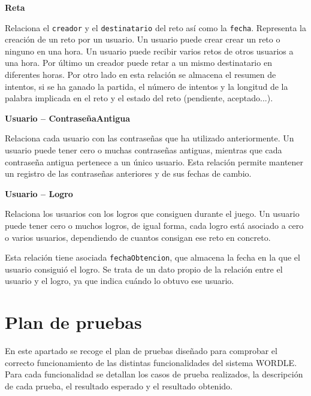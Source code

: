\documentclass[a4paper,11pt]{article}
\begin{document}
\par\vspace{0.5cm}
\noindent\textbf{Reta}

Relaciona el \texttt{creador} y el \texttt{destinatario} del reto así como la \texttt{fecha}. Representa la creación de un reto por un usuario. Un usuario puede crear crear un reto o ninguno en una hora. Un usuario puede recibir varios retos de otros usuarios a una hora. Por último un creador puede retar a un mismo destinatario en diferentes horas. Por otro lado en esta relación se almacena el resumen de intentos, si se ha ganado la partida, el número de intentos y la longitud de la palabra implicada en el reto y el estado del reto (pendiente, aceptado...).

\par\vspace{0.5cm}
\noindent\textbf{Usuario -- ContraseñaAntigua}

Relaciona cada usuario con las contraseñas que ha utilizado anteriormente. Un usuario puede tener cero o muchas contraseñas antiguas, mientras que cada contraseña antigua pertenece a un único usuario. Esta relación permite mantener un registro de las contraseñas anteriores y de sus fechas de cambio.

\par\vspace{0.5cm}
\noindent\textbf{Usuario -- Logro}

Relaciona los usuarios con los logros que consiguen durante el juego. Un usuario puede tener cero o muchos logros, de igual forma,  cada logro está asociado a cero o varios usuarios, dependiendo de cuantos consigan ese reto en concreto.

Esta relación tiene asociada \texttt{fechaObtencion}, que almacena la fecha en la que el usuario consiguió el logro. Se trata de un dato propio de la relación entre el usuario y el logro, ya que indica cuándo lo obtuvo ese usuario.




\clearpage
\section{Plan de pruebas}

En este apartado se recoge el plan de pruebas diseñado para comprobar
el correcto funcionamiento de las distintas funcionalidades del sistema
WORDLE. Para cada funcionalidad se detallan los casos de prueba realizados,
la descripción de cada prueba, el resultado esperado y el resultado
obtenido.
\end{document}
